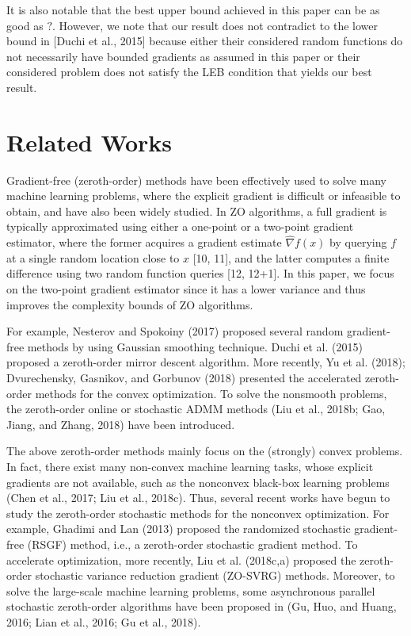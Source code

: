\documentclass{article}
\theoremstyle{definition}
\theoremstyle{remark}
\begin{document}
{\color{RubineRed}





It is also notable that the best upper bound achieved in this paper can be as good as $?$.
However, we note that our result does not contradict to the lower bound in [Duchi et al., 2015] because either their considered random functions do
not necessarily have bounded gradients as assumed in this paper or their considered problem does not satisfy the LEB condition that yields our best result.

}
\section{Related Works}
{\color{Green}
Gradient-free (zeroth-order) methods have been effectively used to solve many machine learning problems, where the explicit gradient is difficult or infeasible to obtain, and have also been widely studied. 
{\color{Brown}
In ZO algorithms, a full gradient is typically approximated using either a one-point or a two-point gradient estimator, where the former acquires a gradient estimate $\hat{\nabla} f(x)$ by querying $f$ at a single random location close to $x$ [10, 11], and the latter computes a finite difference using two random function queries [12, 12+1]. In this paper, we focus on the two-point gradient estimator since it has a lower variance and thus improves the complexity bounds of ZO algorithms.
}

For example, Nesterov and Spokoiny (2017) proposed several random gradient-free
methods by using Gaussian smoothing technique. Duchi et al. (2015) proposed a zeroth-order mirror descent algorithm. More recently, Yu et al. (2018); Dvurechensky, Gasnikov, and Gorbunov (2018) presented the accelerated zeroth-order methods for the convex optimization. To solve
the nonsmooth problems, the zeroth-order online or stochastic ADMM methods (Liu et al., 2018b; Gao, Jiang, and Zhang, 2018) have been introduced.

The above zeroth-order methods mainly focus on the
(strongly) convex problems. In fact, there exist many non-convex machine learning tasks, whose explicit gradients are not available, such as the nonconvex black-box learning problems (Chen et al., 2017; Liu et al., 2018c). Thus, several recent works have begun to study the zeroth-order
stochastic methods for the nonconvex optimization. For example, Ghadimi and Lan (2013) proposed the randomized stochastic gradient-free (RSGF) method, i.e., a zeroth-order stochastic gradient method. To accelerate optimization, more recently, Liu et al. (2018c,a) proposed the zeroth-order stochastic variance reduction gradient (ZO-SVRG)
methods. Moreover, to solve the large-scale machine learning problems, some asynchronous parallel stochastic zeroth-order algorithms have been proposed in (Gu, Huo, and Huang, 2016; Lian et al., 2016; Gu et al., 2018).
{\color{Brown}


}}
\end{document}
